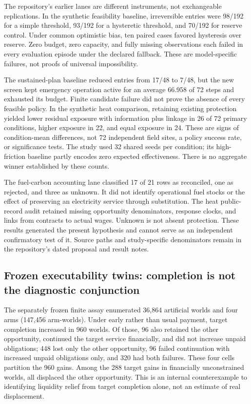 \documentclass[11pt,a4paper]{article}
\numberwithin{equation}{section}
\theoremstyle{definition}
\theoremstyle{plain}
\theoremstyle{remark}
\begin{document}
The repository's earlier lanes are different instruments, not exchangeable replications. In the synthetic feasibility baseline, irreversible entries were 98/192 for a simple threshold, 93/192 for a hysteretic threshold, and 70/192 for reserve control. Under common optimistic bias, ten paired cases favored hysteresis over reserve. Zero budget, zero capacity, and fully missing observations each failed in every evaluation episode under the declared fallback. These are model-specific failures, not proofs of universal impossibility.

The sustained-plan baseline reduced entries from 17/48 to 7/48, but the new screen kept emergency operation active for an average 66.958 of 72 steps and exhausted its budget. Finite candidate failure did not prove the absence of every feasible policy. In the synthetic heat comparison, retaining existing protection yielded lower residual exposure with information plus linkage in 26 of 72 primary conditions, higher exposure in 22, and equal exposure in 24. These are signs of condition-mean differences, not 72 independent field sites, a policy success rate, or significance tests. The study used 32 shared seeds per condition; its high-friction baseline partly encodes zero expected effectiveness. There is no aggregate winner established by these counts.

The fuel-carbon accounting lane classified 17 of 21 rows as reconciled, one as rejected, and three as unknown. It did not identify operational fuel stocks or the effect of preserving an electricity service through substitution. The heat public-record audit retained missing opportunity denominators, response clocks, and links from contracts to actual wages. Unknown is not absent protection. These results generated the present hypothesis and cannot serve as an independent confirmatory test of it. Source paths and study-specific denominators remain in the repository's dated proposal and result notes.

\subsection{Frozen executability twins: completion is not the diagnostic conjunction}
\label{sec:twinsresults}

The separately frozen finite assay enumerated 36,864 artificial worlds and four arms (147,456 arm-worlds). Under early rather than usual payment, target completion increased in 960 worlds. Of those, 96 also retained the other opportunity, continued the target service financially, and did not increase unpaid obligations; 448 lost only the other opportunity, 96 failed continuation with increased unpaid obligations only, and 320 had both failures. These four cells partition the 960 gains. Among the 288 target gains in financially unconstrained worlds, all displaced the other opportunity. This is an internal counterexample to identifying liquidity relief from target completion alone, not an estimate of real displacement.
\end{document}
